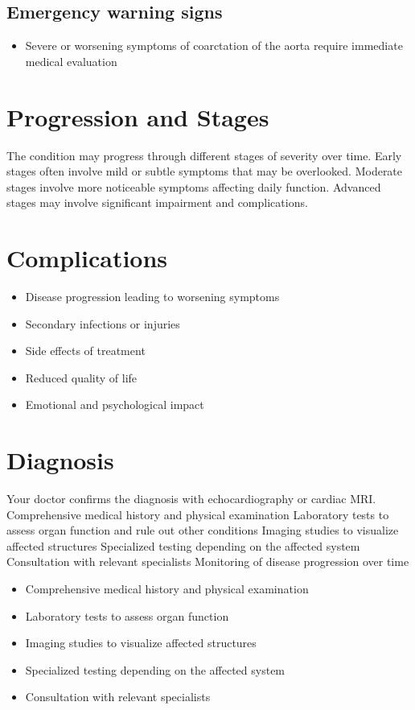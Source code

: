 \subsection{Emergency warning signs}
\begin{itemize}[noitemsep]
  \item Severe or worsening symptoms of coarctation of the aorta require immediate medical evaluation
\end{itemize}
\section{Progression and Stages}
The condition may progress through different stages of severity over time. Early stages often involve mild or subtle symptoms that may be overlooked. Moderate stages involve more noticeable symptoms affecting daily function. Advanced stages may involve significant impairment and complications.
\section{Complications}
\begin{itemize}[noitemsep]
  \item Disease progression leading to worsening symptoms
  \item Secondary infections or injuries
  \item Side effects of treatment
  \item Reduced quality of life
  \item Emotional and psychological impact
\end{itemize}
\section{Diagnosis}
Your doctor confirms the diagnosis with echocardiography or cardiac MRI. Comprehensive medical history and physical examination Laboratory tests to assess organ function and rule out other conditions Imaging studies to visualize affected structures Specialized testing depending on the affected system Consultation with relevant specialists Monitoring of disease progression over time

\begin{itemize}[noitemsep]
  \item Comprehensive medical history and physical examination
  \item Laboratory tests to assess organ function
  \item Imaging studies to visualize affected structures
  \item Specialized testing depending on the affected system
  \item Consultation with relevant specialists
\end{itemize}
